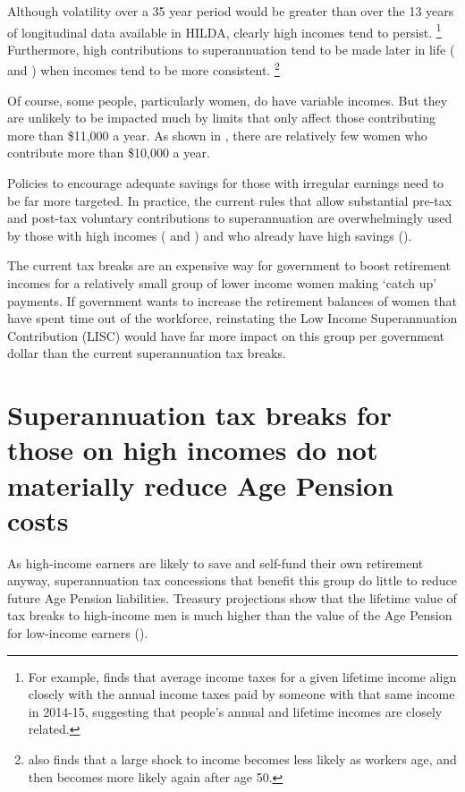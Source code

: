 Although volatility over a 35 year period would be greater than over the 13 years of longitudinal data available in HILDA, clearly high incomes tend to persist.%
\footnote{For example, \textcite[][96]{ProductivityCommission2015-Tax-and-transfer-incidence}  finds that average income taxes for a given lifetime income align closely with the annual income taxes paid by someone with that same income in 2014-15, suggesting that people’s annual and lifetime incomes are closely related.}
Furthermore, high contributions to superannuation tend to be made later in life ( and ) when incomes tend to be more consistent.%
\footnote{\textcite{Karahan2015} also finds that a large shock to income becomes less likely as workers age, and then becomes more likely again after age 50.} 

Of course, some people, particularly women, do have variable incomes. But they are unlikely to be impacted much by limits that only affect those contributing more than \$11,000 a year. As shown in , there are relatively few women who contribute more than \$10,000 a year. 

Policies to encourage adequate savings for those with irregular earnings need to be far more targeted. In practice, the current rules that allow substantial pre-tax and post-tax voluntary contributions to superannuation are overwhelmingly used by those with high incomes ( and ) and who already have high savings (). 

The current tax breaks are an expensive way for government to boost retirement incomes for a relatively small group of lower income women making ‘catch up’ payments. If government wants to increase the retirement balances of women that have spent time out of the workforce, reinstating the Low Income Superannuation Contribution (LISC) would have far more impact on this group per government dollar than the current superannuation tax breaks. 

\section{Superannuation tax breaks for those on high incomes do not materially reduce Age Pension costs}\label{sec:SUPER-3-5}
As high-income earners are likely to save and self-fund their own retirement anyway, superannuation tax concessions that benefit this group do little to reduce future Age Pension liabilities. Treasury projections show that the lifetime value of tax breaks to high-income men is much higher than the value of the Age Pension for low-income earners (). 

